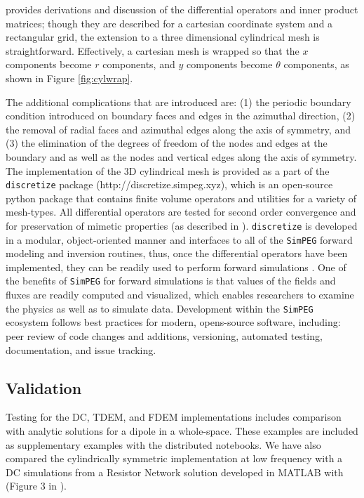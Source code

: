 \documentclass[preprint,review,3p,times,onecolumn,authoryear]{elsarticle}
\begin{document}
\cite{Haber2014} provides derivations and discussion of the differential operators and inner product matrices; though they are described for a cartesian coordinate system and a rectangular grid, the extension to a three dimensional cylindrical mesh is straightforward. Effectively, a cartesian mesh is wrapped so that the $x$ components become $r$ components, and $y$ components become $\theta$ components, as shown in Figure \ref{fig:cylwrap}.




The additional complications that are introduced are: (1) the periodic boundary condition introduced on boundary faces and edges in the azimuthal direction, (2) the removal of radial faces and azimuthal edges along the axis of symmetry, and (3) the elimination of the degrees of freedom of the nodes and edges at the boundary and as well as the nodes and vertical edges along the axis of symmetry. The implementation of the 3D cylindrical mesh is provided as a part of the \texttt{discretize} package (http://discretize.simpeg.xyz), which is an open-source python package that contains finite volume operators and utilities for a variety of mesh-types. All differential operators are tested for second order convergence and for preservation of mimetic properties (as described in \cite{Haber2014}). \texttt{discretize} is developed in a modular, object-oriented manner and interfaces to all of the \texttt{SimPEG} forward modeling and inversion routines, thus, once the differential operators have been implemented, they can be readily used to perform forward simulations \citep{Cockett2015, Heagy2017}.  One of the benefits of \texttt{SimPEG} for forward simulations is that values of the fields and fluxes are readily computed and visualized, which enables researchers to examine the physics as well as to simulate data. Development within the \texttt{SimPEG} ecosystem follows best practices for modern, opens-source software, including: peer review of code changes and additions, versioning, automated testing, documentation, and issue tracking.


\subsection{Validation}

Testing for the DC, TDEM, and FDEM implementations includes comparison with analytic solutions for a dipole in a whole-space. These examples are included as supplementary examples with the distributed notebooks. We have also compared the cylindrically symmetric implementation at low frequency with a DC simulations from a Resistor Network solution developed in MATLAB with (Figure 3 in \cite{Yang2016}).
\end{document}
